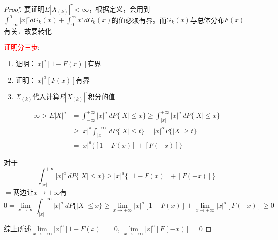 \begin{proof}
    要证明$E|X_{(k)}|^{r}<\infty$，根据定义，会用到$\displaystyle\int_{-\infty}^{0}|x|^{r}dG_k(x)+\displaystyle\int_{0}^{\infty}x^rdG_k(x)$的值必须有界。而$G_k(x)$与总体分布$F(x)$有关，故要转化

    \textcolor{red}{证明分三步}:

    \begin{enumerate}[label = \arabic*\textsuperscript{$\circ$}]
        \item 证明：$|x|^{a}[1-F(x)]$有界
        \item 证明：$|x|^{a}[F(x)]$有界
        \item $X_{(k)}$代入计算$E|X_{(k)}|^{r}$积分的值
    \end{enumerate}

    \[
        \begin{array}{ll}
            \infty>E|X|^{a} &= \displaystyle\int_{-\infty}^{+\infty}|x|^a\ dP\{ |X|\leqslant x \}\geqslant \displaystyle\int_{|x|}^{+\infty}|x|^{a}\ dP\{ |X|\leqslant x \}\\
            &\geqslant |x|^{a}\displaystyle\int_{|x|}^{+\infty}\ dP\{ |X|\leqslant t \} = |x|^{\alpha}P\{ |X|\geqslant t \}\\
            &=|x|^a\{ [1-F(x)] + [F(-x)] \}
        \end{array}
    \]

    对于
    \[
        \displaystyle\int_{|x|}^{+\infty}|x|^{a}\ dP\{ |X|\leqslant x \}
            \geqslant |x|^a\{ [1-F(x)] + [F(-x)] \}
    \]
    $=$两边让$x\rightarrow +\infty$有
    \[
        0=\lim\limits_{x\rightarrow \infty}\displaystyle\int_{|x|}^{+\infty}|x|^{a}\ dP\{ |X|\leqslant x \}
        \geqslant \lim\limits_{x\rightarrow +\infty}|x|^a [1-F(x)] + \lim\limits_{x\rightarrow +\infty}|x|^a[F(-x)]\geqslant 0
    \]

    综上所述$\lim\limits_{x\rightarrow +\infty}|x|^a [1-F(x)] = 0,\     \lim\limits_{x\rightarrow +\infty}|x|^a[F(-x)]=0$


\end{proof}
